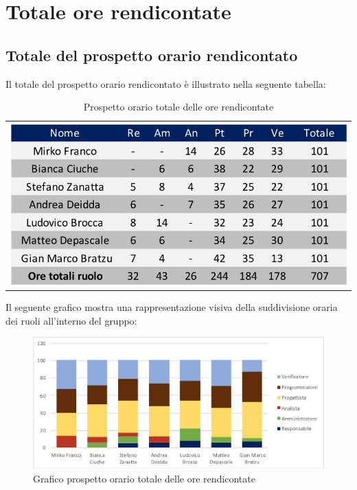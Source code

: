 \section{Totale ore rendicontate}
\subsection{Totale del  prospetto orario rendicontato}
Il totale del prospetto orario rendicontato è illustrato nella seguente tabella:

\begin{table}[!ht]
	\begin{center}
		\begin{tabular}{c}
			\includegraphics{images/tabellaOreRendicontate.png}
		\end{tabular}
		\caption{Prospetto orario totale delle ore rendicontate}
	\end{center}
\end{table}

Il seguente grafico mostra una rappresentazione visiva della suddivisione oraria dei ruoli all'interno del gruppo:
\begin{figure}[!ht]
	\begin{center}
		\includegraphics[scale=0.80]{images/grafoOreRendicontate.png}
		\caption{Grafico prospetto orario totale delle ore rendicontate}
	\end{center}
\end{figure}

